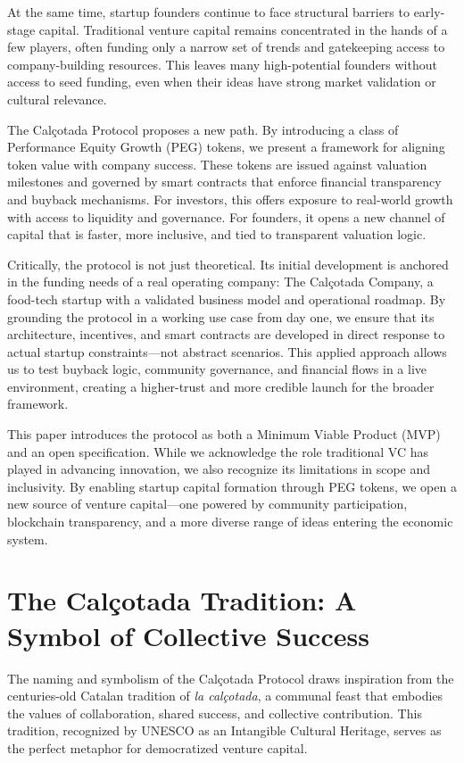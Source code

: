 \documentclass[conference]{IEEEtran}
\begin{document}
At the same time, startup founders continue to face structural barriers to early-stage capital. Traditional venture capital remains concentrated in the hands of a few players, often funding only a narrow set of trends and gatekeeping access to company-building resources. This leaves many high-potential founders without access to seed funding, even when their ideas have strong market validation or cultural relevance.

The Calçotada Protocol proposes a new path. By introducing a class of Performance Equity Growth (PEG) tokens, we present a framework for aligning token value with company success. These tokens are issued against valuation milestones and governed by smart contracts that enforce financial transparency and buyback mechanisms. For investors, this offers exposure to real-world growth with access to liquidity and governance. For founders, it opens a new channel of capital that is faster, more inclusive, and tied to transparent valuation logic.

Critically, the protocol is not just theoretical. Its initial development is anchored in the funding needs of a real operating company: The Calçotada Company, a food-tech startup with a validated business model and operational roadmap. By grounding the protocol in a working use case from day one, we ensure that its architecture, incentives, and smart contracts are developed in direct response to actual startup constraints—not abstract scenarios. This applied approach allows us to test buyback logic, community governance, and financial flows in a live environment, creating a higher-trust and more credible launch for the broader framework.

This paper introduces the protocol as both a Minimum Viable Product (MVP) and an open specification. While we acknowledge the role traditional VC has played in advancing innovation, we also recognize its limitations in scope and inclusivity. By enabling startup capital formation through PEG tokens, we open a new source of venture capital—one powered by community participation, blockchain transparency, and a more diverse range of ideas entering the economic system.

\section{The Calçotada Tradition: A Symbol of Collective Success}

The naming and symbolism of the Calçotada Protocol draws inspiration from the centuries-old Catalan tradition of \textit{la calçotada}, a communal feast that embodies the values of collaboration, shared success, and collective contribution. This tradition, recognized by UNESCO as an Intangible Cultural Heritage, serves as the perfect metaphor for democratized venture capital.
\end{document}
